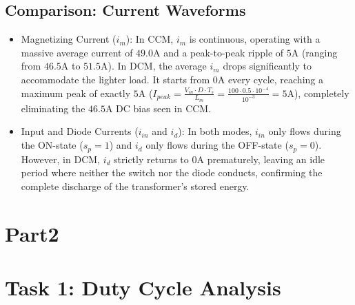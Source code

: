 \documentclass{article}
\begin{document}
\subsection{Comparison: Current Waveforms}
\begin{itemize}
    \item Magnetizing Current ($i_m$): In CCM, $i_m$ is continuous, operating with a massive average current of $49.0\text{A}$ and a peak-to-peak ripple of $5\text{A}$ (ranging from $46.5\text{A}$ to $51.5\text{A}$). In DCM, the average $i_m$ drops significantly to accommodate the lighter load. It starts from $0\text{A}$ every cycle, reaching a maximum peak of exactly $5\text{A}$ ($I_{peak} = \frac{V_{in} \cdot D \cdot T_s}{L_m} = \frac{100 \cdot 0.5 \cdot 10^{-4}}{10^{-3}} = 5\text{A}$), completely eliminating the $46.5\text{A}$ DC bias seen in CCM.
\end{itemize}
\begin{itemize}
    \item Input and Diode Currents ($i_{in}$ and $i_d$): In both modes, $i_{in}$ only flows during the ON-state ($s_p = 1$) and $i_d$ only flows during the OFF-state ($s_p = 0$). However, in DCM, $i_d$ strictly returns to $0\text{A}$ prematurely, leaving an idle period where neither the switch nor the diode conducts, confirming the complete discharge of the transformer's stored energy.
\end{itemize}

\section*{Part2}
\section{Task 1: Duty Cycle Analysis}
\end{document}
